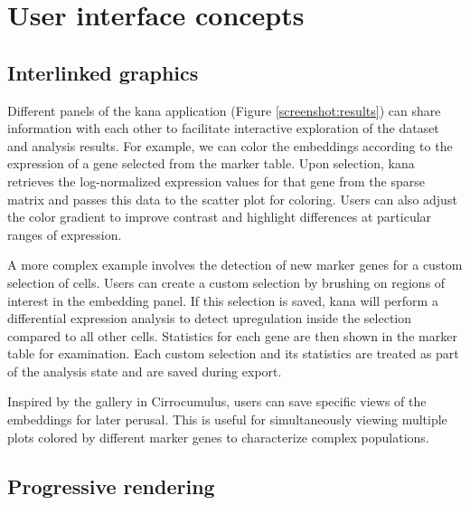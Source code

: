 \documentclass{article}
\begin{document}

\section{User interface concepts}

\subsection{Interlinked graphics}

Different panels of the kana application (Figure \ref{screenshot:results}) can share information with each other to facilitate interactive exploration of the dataset and analysis results.
For example, we can color the embeddings according to the expression of a gene selected from the marker table.
Upon selection, kana retrieves the log-normalized expression values for that gene from the sparse matrix and passes this data to the scatter plot for coloring.
Users can also adjust the color gradient to improve contrast and highlight differences at particular ranges of expression.

A more complex example involves the detection of new marker genes for a custom selection of cells.
Users can create a custom selection by brushing on regions of interest in the embedding panel.
If this selection is saved, kana will perform a differential expression analysis to detect upregulation inside the selection compared to all other cells.
Statistics for each gene are then shown in the marker table for examination.
Each custom selection and its statistics are treated as part of the analysis state and are saved during export.

Inspired by the gallery in Cirrocumulus, users can save specific views of the embeddings for later perusal.
This is useful for simultaneously viewing multiple plots colored by different marker genes to characterize complex populations.

\subsection{Progressive rendering}
\end{document}
